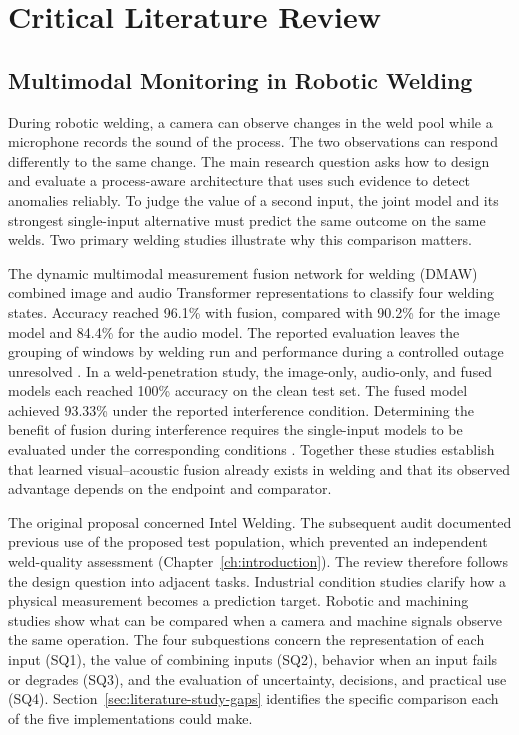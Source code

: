 \chapter{Critical Literature Review}
\label{ch:literature}

\section*{Multimodal Monitoring in Robotic Welding}
During robotic welding, a camera can observe changes in the weld pool while a microphone records the sound of the process. The two observations can respond differently to the same change. The main research question asks how to design and evaluate a process-aware architecture that uses such evidence to detect anomalies reliably. To judge the value of a second input, the joint model and its strongest single-input alternative must predict the same outcome on the same welds. Two primary welding studies illustrate why this comparison matters.

The dynamic multimodal measurement fusion network for welding (DMAW) combined image and audio Transformer representations to classify four welding states. Accuracy reached 96.1\% with fusion, compared with 90.2\% for the image model and 84.4\% for the audio model. The reported evaluation leaves the grouping of windows by welding run and performance during a controlled outage unresolved \citep[PDF p.~7, Table~III]{P003}. In a weld-penetration study, the image-only, audio-only, and fused models each reached 100\% accuracy on the clean test set. The fused model achieved 93.33\% under the reported interference condition. Determining the benefit of fusion during interference requires the single-input models to be evaluated under the corresponding conditions \citep[PDF pp.~18, 22, Tables~1--3]{Hua2026Weld}. Together these studies establish that learned visual--acoustic fusion already exists in welding and that its observed advantage depends on the endpoint and comparator.

The original proposal concerned Intel Welding. The subsequent audit documented previous use of the proposed test population, which prevented an independent weld-quality assessment (Chapter~\ref{ch:introduction}). The review therefore follows the design question into adjacent tasks. Industrial condition studies clarify how a physical measurement becomes a prediction target. Robotic and machining studies show what can be compared when a camera and machine signals observe the same operation. The four subquestions concern the representation of each input (SQ1), the value of combining inputs (SQ2), behavior when an input fails or degrades (SQ3), and the evaluation of uncertainty, decisions, and practical use (SQ4). Section~\ref{sec:literature-study-gaps} identifies the specific comparison each of the five implementations could make.

